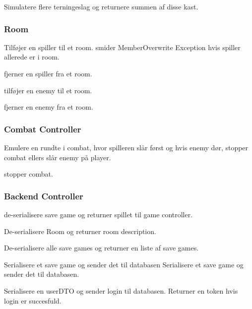{%
  Simulatere flere terningeslag og returnere summen af disse kast.
}

\subsubsection{Room}

{%
  Tilføjer en spiller til et room. smider MemberOverwrite Exception hvis spiller allerede er i room.
}

{%
  fjerner en spiller fra et room.
}

{%
  tilføjer en enemy til et room.
}

{%
  fjerner en enemy fra et room.
}

\subsubsection{Combat Controller}

{%
  Emulere en rundte i combat, hvor spilleren slår først og hvis enemy dør, stopper combat ellers slår enemy på player.
}

{%
  stopper combat.
}

\subsubsection{Backend Controller}

{%
  de-serialisere save game og returner spillet til game controller. 
}

{%
  De-serialisere Room og returner room description.
}

{%
  De-serialisere alle save games og returner en liste af save games.
}

{%
  Serialisere et save game og sender det til databasen
  Serialisere et save game og sender det til databasen.
}

{%
  Serialisere en userDTO og sender login til databasen. Returner en token hvis login er succesfuld.
}

